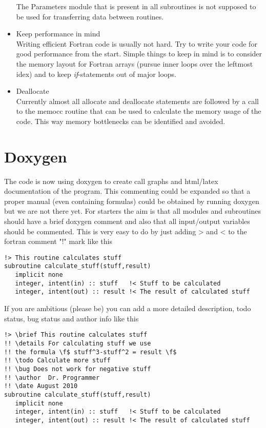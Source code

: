 \documentclass{article}
\begin{document}
\begin{itemize}
The Parameters module that is present in all subroutines is not supposed to be used for transferring data between routines.
 \item{Keep performance in mind} \\
 Writing efficient Fortran code is usually not hard. Try to write your code for good performance from the start. Simple things to keep in mind is to consider the memory layout for Fortran arrays (pursue inner loops over the leftmost idex) and to keep {\it if}-statements out of major loops.
 \item{Deallocate} \\
  Currently almost all allocate and deallocate statements are followed by a call to the memocc routine that can be used to calculate the memory usage of the code. This way memory bottlenecks can be identified and avoided.
\end{itemize}

\section{Doxygen}
The code is now using doxygen to create call graphs and html/latex documentation of the program. This commenting could be expanded so that a proper manual (even containing formulas) could be obtained by running doxygen but we are not there yet. For starters the aim is that all modules and subroutines should have a brief doxygen comment and also that all input/output variables should be commented. This is very easy to do by just adding > and < to the fortran comment "!" mark like this
\begin{verbatim}
!> This routine calculates stuff
subroutine calculate_stuff(stuff,result)
   implicit none
   integer, intent(in) :: stuff   !< Stuff to be calculated
   integer, intent(out) :: result !< The result of calculated stuff
\end{verbatim}
If you are ambitious (please be) you can add a more detailed description, todo status, bug status and author info like this
\begin{verbatim}
!> \brief This routine calculates stuff
!! \details For calculating stuff we use 
!! the formula \f$ stuff^3-stuff^2 = result \f$
!! \todo Calculate more stuff
!! \bug Does not work for negative stuff
!! \author  Dr. Programmer
!! \date August 2010
subroutine calculate_stuff(stuff,result)
   implicit none
   integer, intent(in) :: stuff   !< Stuff to be calculated
   integer, intent(out) :: result !< The result of calculated stuff
\end{verbatim}
\end{document}
